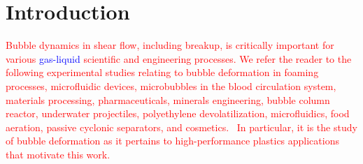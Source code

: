 \documentclass{elsarticle}
\begin{document}

\linenumbers
\section{Introduction}

%
%
\textcolor{red} {
Bubble dynamics in shear flow, including breakup, is critically important for various \textcolor{blue} {gas-liquid} scientific and engineering processes.  We refer the reader to the following experimental studies relating to bubble deformation in foaming processes, microfluidic devices, microbubbles in the blood circulation system, materials processing, pharmaceuticals, minerals engineering, bubble column reactor, underwater projectiles, polyethylene devolatilization, microfluidics, food aeration, passive cyclonic separators, and cosmetics\cite{ChuFinBouAtaHamPug19,MulTobDreFisWin08,BenRodFauPinFerPerGarMirLim18,DreSai15,EFTEKHARI2021837,WANG2023108105,doi:10.1021/acs.langmuir.1c01814,yoshikawa2010bubble,CanedoETAL,GAO2022103212,WONG2012417,PolyethyleneDevo,FRENSE2024120579,lohse2018bubble,schluter2021small,SANOGO2023112478,hoyt2013performance,sines2020study}.  In particular, it is the study of bubble deformation as it pertains to high-performance plastics applications that motivate this work.
}
\par
\end{document}
